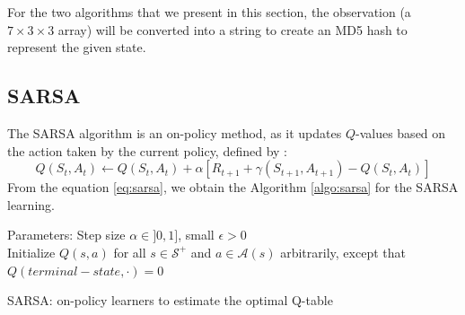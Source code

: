 For the two algorithms that we present in this section, the observation (a $7\times3\times3$ array) will be converted into a string to create an MD5 hash to represent the given state.
\subsection{SARSA}
The SARSA algorithm is an on-policy method, as it updates $Q$-values based on the action taken by the current policy, defined by :
\begin{equation}\label{eq:sarsa}
	Q(S_t, A_t)\leftarrow Q(S_t, A_t) + \alpha[R_{t+1} + \gamma(S_{t+1}, A_{t+1}) - Q(S_t, A_t)]
\end{equation}
From the equation \eqref{eq:sarsa}, we obtain the Algorithm \ref{algo:sarsa} for the SARSA learning.
\begin{algorithm}
	Parameters: Step size $\alpha\in]0,1]$, small $\epsilon>0$\\
	Initialize $Q(s,a)$ for all $s\in\mathcal{S}^{+}$ and $a\in\mathcal{A}(s)$ arbitrarily, except that $Q(terminal-state, \cdot)=0$\\
	\caption{SARSA: on-policy learners to estimate the optimal Q-table}
	\label{algo:sarsa}
\end{algorithm}

